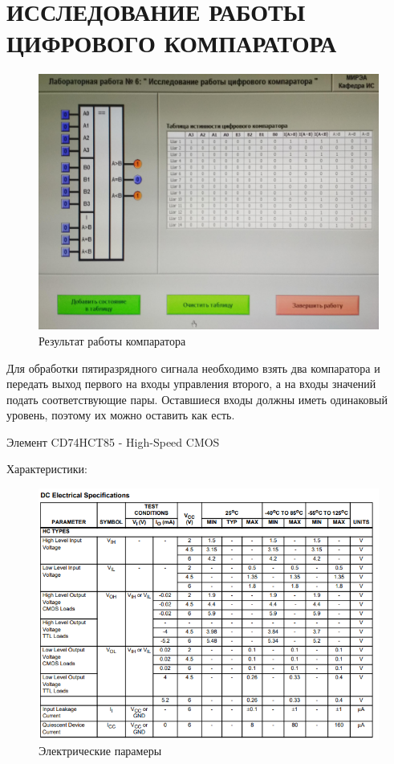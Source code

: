 \section{ИССЛЕДОВАНИЕ РАБОТЫ ЦИФРОВОГО КОМПАРАТОРА}

\begin{figure}[H]
	\centering
	\includegraphics[width=0.95\linewidth]{imgs/6/1}
	\caption{Результат работы компаратора}
	\label{fig:6_}
\end{figure}

Для обработки пятиразрядного сигнала необходимо взять два компаратора и передать выход первого на входы управления второго, а на входы значений подать соответствующие пары. 
Оставшиеся входы должны иметь одинаковый уровень, поэтому их можно оставить как есть.

Элемент CD74HCT85 - High-Speed CMOS

Характеристики:

\begin{figure}[H]
	\centering
	\includegraphics[width=0.95\linewidth]{imgs/6/ti1}
	\caption{Электрические парамеры}
	\label{fig:6_ti1}
\end{figure}


